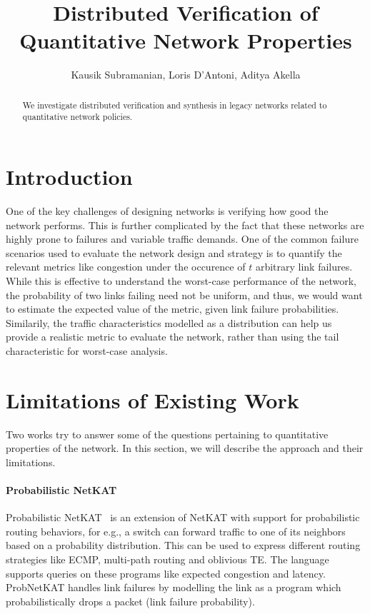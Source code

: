 \documentclass[]{article}
\title{Distributed Verification of Quantitative Network Properties}
\author{Kausik Subramanian, Loris D'Antoni, Aditya Akella}
\begin{document}
\maketitle

\begin{abstract}
We investigate distributed verification and synthesis in 
legacy networks related to quantitative network policies.
\end{abstract}

\section{Introduction}
One of the key challenges of designing networks is verifying
how good the network performs. This is further complicated 
by the fact that these networks are highly prone to failures
and variable traffic demands. One of the common failure scenarios
used to evaluate the network design and strategy is to quantify 
the relevant metrics like congestion under the occurence  
of $t$ arbitrary link failures. While this is effective to understand
the worst-case performance of the network, the probability
of two links failing need not be uniform, and thus, we would 
want to estimate the expected value of the metric, given
link failure probabilities. Similarily, the traffic characteristics
modelled as a distribution can help us provide a realistic
metric to evaluate the network, rather than using the tail
characteristic for worst-case analysis.

\section{Limitations of Existing Work}
Two works try to answer some of the questions pertaining to
quantitative properties of the network. In this section, we 
will describe the approach and their limitations.

\paragraph{Probabilistic NetKAT}
Probabilistic NetKAT~\cite{probnetkat, probnetkatpopl17} 
is an extension of NetKAT with support
for probabilistic routing behaviors, for e.g., a switch 
can forward traffic to one of its neighbors based on a 
probability distribution. This can be used to express different
routing strategies like ECMP, multi-path routing and 
oblivious TE. The language supports queries 
on these programs like expected congestion and latency. ProbNetKAT
handles link failures by modelling the link as a program
which probabilistically drops a packet (link failure
probability).
\end{document}
